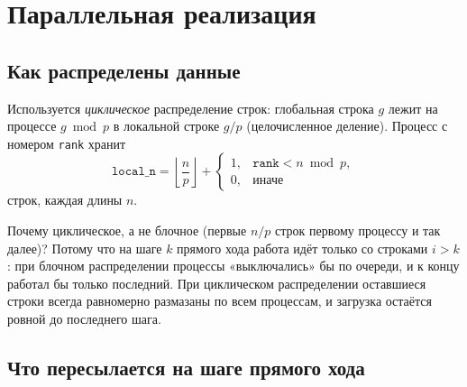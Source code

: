 \documentclass[11pt,a4paper]{report}
\begin{document}
\section{Параллельная реализация}

\subsection{Как распределены данные}

Используется \emph{циклическое} распределение строк: глобальная строка $g$
лежит на процессе $g \bmod p$ в локальной строке $g / p$ (целочисленное
деление). Процесс с номером \texttt{rank} хранит
\[
\texttt{local\_n} = \left\lfloor \frac{n}{p}\right\rfloor +
\begin{cases} 1, & \texttt{rank} < n \bmod p,\\ 0,&\text{иначе}\end{cases}
\]
строк, каждая длины $n$.

Почему циклическое, а не блочное (первые $n/p$ строк первому процессу и так
далее)? Потому что на шаге $k$ прямого хода работа идёт только со строками
$i>k$: при блочном распределении процессы «выключались» бы по очереди, и к концу
работал бы только последний. При циклическом распределении оставшиеся строки
всегда равномерно размазаны по всем процессам, и загрузка остаётся ровной до
последнего шага.

\subsection{Что пересылается на шаге прямого хода}
\end{document}
